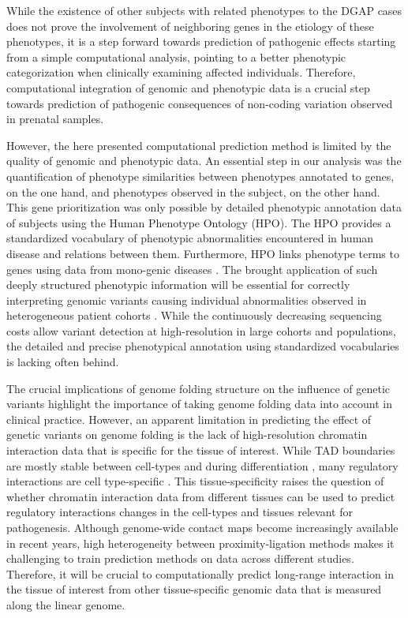 \documentclass[a4paper,twoside=true,openright,parskip=full,chapterprefix=true,11pt,headings=normal,bibliography=totoc,listof=totoc,titlepage=on,captions=tableabove,draft=false]{scrreprt}
\theoremstyle{definition}
\theoremstyle{definition}
\theoremstyle{definition}
\theoremstyle{remark}
\begin{document}
While the existence of other subjects with related phenotypes to the
DGAP cases does not prove the involvement of neighboring genes in the
etiology of these phenotypes, it is a step forward towards prediction of
pathogenic effects starting from a simple computational analysis,
pointing to a better phenotypic categorization when clinically examining
affected individuals. Therefore, computational integration of genomic
and phenotypic data is a crucial step towards prediction of pathogenic
consequences of non-coding variation observed in prenatal samples.

However, the here presented computational prediction method is limited
by the quality of genomic and phenotypic data. An essential step in our
analysis was the quantification of phenotype similarities between
phenotypes annotated to genes, on the one hand, and phenotypes observed
in the subject, on the other hand. This gene prioritization was only
possible by detailed phenotypic annotation data of subjects using the
Human Phenotype Ontology (HPO). The HPO provides a standardized
vocabulary of phenotypic abnormalities encountered in human disease and
relations between them. Furthermore, HPO links phenotype terms to genes
using data from mono-genic diseases \citep{Kohler2014}. The brought
application of such deeply structured phenotypic information will be
essential for correctly interpreting genomic variants causing individual
abnormalities observed in heterogeneous patient cohorts
\citep{Brookes2015}. While the continuously decreasing sequencing costs
allow variant detection at high-resolution in large cohorts and
populations, the detailed and precise phenotypical annotation using
standardized vocabularies is lacking often behind.

The crucial implications of genome folding structure on the influence of
genetic variants highlight the importance of taking genome folding data
into account in clinical practice. However, an apparent limitation in
predicting the effect of genetic variants on genome folding is the lack
of high-resolution chromatin interaction data that is specific for the
tissue of interest. While TAD boundaries are mostly stable between
cell-types \citep{Dixon2012, Rao2014, Schmitt2016} and during
differentiation \citep{Dixon2015}, many regulatory interactions are cell
type-specific \citep{LeDily2014, Dixon2015}. This tissue-specificity
raises the question of whether chromatin interaction data from different
tissues can be used to predict regulatory interactions changes in the
cell-types and tissues relevant for pathogenesis. Although genome-wide
contact maps become increasingly available in recent years, high
heterogeneity between proximity-ligation methods makes it challenging to
train prediction methods on data across different studies. Therefore, it
will be crucial to computationally predict long-range interaction in the
tissue of interest from other tissue-specific genomic data that is
measured along the linear genome.
\end{document}
